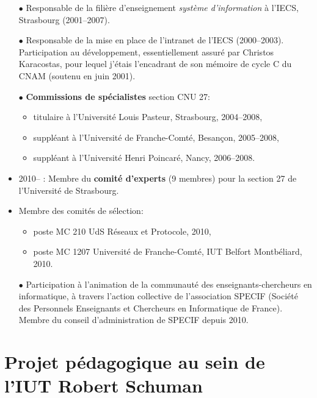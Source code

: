 \documentclass[11pt]{article}
\begin{document}
\begin{itemize}
\item[$\bullet$] Responsable de la filière d'enseignement \emph{système d'information} à l'IECS, Strasbourg (2001--2007).\\

\item[$\bullet$] 
Responsable de la mise en place de l'intranet de l'IECS (2000--2003). 
Participation au développement, essentiellement assuré par Christos Karacostas,
pour lequel j'étais l'encadrant de son mémoire de cycle C du CNAM (soutenu en juin 2001).\\

\item[$\bullet$] \textbf{Commissions de spécialistes} section CNU 27:
	\begin{itemize}
		\item titulaire à l'Université Louis Pasteur, Strasbourg, 2004--2008,
		\item suppléant à l'Université de Franche-Comté, Besançon, 2005--2008,
		\item suppléant à l'Université Henri Poincaré, Nancy, 2006--2008.\\
	\end{itemize}
	\item 2010-- : Membre du \textbf{comité d'experts} (9 membres) pour la section 
		27 de l'Université de Strasbourg.
	\item Membre des comités de sélection:
	\begin{itemize}
		\item poste MC 210 UdS Réseaux et Protocole, 2010,
		\item poste MC 1207 Université de Franche-Comté, IUT Belfort Montbéliard, 2010.\\
	\end{itemize}


\item[$\bullet$] 
Participation à l'animation de la communauté des enseignants-chercheurs en informatique, à travers 
l'action collective de l'association SPECIF (Société des Personnels Enseignants et Chercheurs 
en Informatique de France). Membre du conseil d'administration de SPECIF depuis 2010.
\end{itemize}
\vspace{1cm}




\section{Projet pédagogique au sein de l'IUT Robert Schuman}
\end{document}
